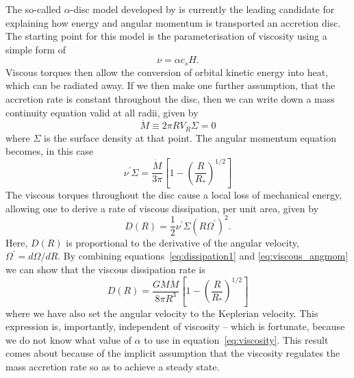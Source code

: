 The so-called $\alpha$-disc model developed by 
\cite[][hereafter SS73]{shakurasunyaev1973} is
currently the leading candidate for explaining how energy and angular momentum
is transported an accretion disc. The starting point for this model is the parameterisation
of viscosity using a simple form of
\begin{equation}
\nu = \alpha c_s H.
\label{eq:viscosity}
\end{equation}
Viscous torques then allow the conversion of orbital kinetic energy into heat, 
which can be radiated away. If we then make one further assumption, that the accretion rate is
constant throughout the disc, then we can write down a mass continuity equation
valid at all radii, given by
\begin{equation}
\dot{M} \equiv 2 \pi R V_R \Sigma = 0
\end{equation}
where $\Sigma$ is the surface density at that point. The angular momentum equation becomes, in this case
\begin{equation}
\nu^\prime \Sigma = \frac{\dot{M}}{3 \pi} \left[1 - \left( \frac{R}{R_*} \right)^{1/2} \right]
\label{eq:viscous_angmom}
\end{equation}
The viscous torques throughout the disc cause a local loss of mechanical energy, allowing 
one to derive \citep[see, e.g.][]{fkrbook} a rate of viscous dissipation, per unit area, given by
\begin{equation}
D(R) = \frac{1}{2} \nu^\prime \Sigma (R \Omega^\prime)^2.
\label{eq:dissipation1}
\end{equation}
Here, $D(R)$ is proportional to the derivative of the angular velocity, $\Omega^\prime=d\Omega/dR$.
By combining equations~\ref{eq:dissipation1} and \ref{eq:viscous_angmom} we can show that the 
viscous dissipation rate is 
\begin{equation}
D(R) = \frac{G M \dot{M}}{8 \pi R^3} \left[1 - \left( \frac{R}{R_*} \right)^{1/2} \right]
\label{eq:dissipation2}
\end{equation}
where we have also set the angular velocity to the Keplerian velocity. 
This expression is, importantly, independent of viscosity -- which is fortunate, because
we do not know what value of $\alpha$ to use in equation~\ref{eq:viscosity}.
This result comes about because of the implicit assumption that the viscosity regulates
the mass accretion rate so as to achieve a steady state.

